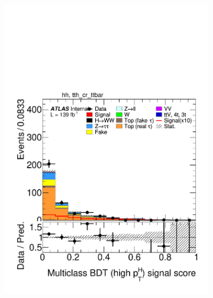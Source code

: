 \begin{figure}[h]
  \begin{subfigure}[b]{0.32\textwidth}
    \includegraphics[width=\textwidth]{images/sr_cr_plots/plot_tth_signal_multiclass_gt200_hh_tth_cr_ttbar.pdf}
    \caption{}
  \end{subfigure}
  \begin{subfigure}[b]{0.32\textwidth}

\end{subfigure}
\end{figure}
